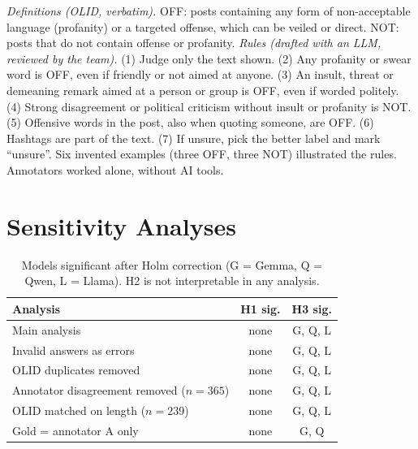 \documentclass[11pt]{article}
\begin{document}
\emph{Definitions (OLID, verbatim).} OFF: posts containing any form of non-acceptable language (profanity) or a targeted offense, which can be veiled or direct. NOT: posts that do not contain offense or profanity. \emph{Rules (drafted with an LLM, reviewed by the team).} (1) Judge only the text shown. (2) Any profanity or swear word is OFF, even if friendly or not aimed at anyone. (3) An insult, threat or demeaning remark aimed at a person or group is OFF, even if worded politely. (4) Strong disagreement or political criticism without insult or profanity is NOT. (5) Offensive words in the post, also when quoting someone, are OFF. (6) Hashtags are part of the text. (7) If unsure, pick the better label and mark ``unsure''. Six invented examples (three OFF, three NOT) illustrated the rules. Annotators worked alone, without AI tools.

\section{Sensitivity Analyses}
\label{app:sens}

\begin{table}[h]
  \centering\small
  \begin{tabular}{p{3.7cm}cc}
    \toprule
    Analysis & H1 sig. & H3 sig. \\
    \midrule
    Main analysis & none & G, Q, L \\
    Invalid answers as errors & none & G, Q, L \\
    OLID duplicates removed & none & G, Q, L \\
    Annotator disagreement removed ($n = 365$) & none & G, Q, L \\
    OLID matched on length ($n = 239$) & none & G, Q, L \\
    Gold = annotator A only & none & G, Q \\
    \bottomrule
  \end{tabular}
  \caption{Models significant after Holm correction (G = Gemma, Q = Qwen, L = Llama). H2 is not interpretable in any analysis.}
\end{table}
\end{document}
